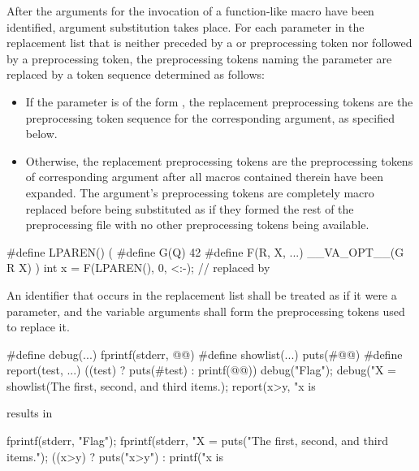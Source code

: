 \pnum
After the arguments for the invocation of a function-like macro have
been identified, argument substitution takes place.
For each parameter in the replacement list that is neither
preceded by a \tcode{\#} or \tcode{\#\#} preprocessing token nor
followed by a \tcode{\#\#} preprocessing token, the preprocessing tokens
naming the parameter are replaced by a token sequence determined as follows:
\begin{itemize}
\item
  If the parameter is of the form ,
  the replacement preprocessing tokens are the
  preprocessing token sequence for the corresponding argument,
  as specified below.
\item
  Otherwise, the replacement preprocessing tokens are the
  preprocessing tokens of corresponding argument after all
  macros contained therein have been expanded. The argument's
  preprocessing tokens are completely macro replaced before
  being substituted as if they formed the rest of the preprocessing
  file with no other preprocessing tokens being available.
\end{itemize}
\begin{example}
\begin{codeblock}
#define LPAREN() (
#define G(Q) 42
#define F(R, X, ...)  __VA_OPT__(G R X) )
int x = F(LPAREN(), 0, <:-);    // replaced by 
\end{codeblock}
\end{example}

\pnum
{}%
An identifier  that occurs in the replacement list
shall be treated as if it were a parameter, and the variable arguments shall form
the preprocessing tokens used to replace it.

\pnum
\begin{example}
\begin{codeblock}
#define debug(...) fprintf(stderr, @@)
#define showlist(...) puts(#@@)
#define report(test, ...) ((test) ? puts(#test) : printf(@@))
debug("Flag");
debug("X = %
showlist(The first, second, and third items.);
report(x>y, "x is %
\end{codeblock}
results in
\begin{codeblock}
fprintf(stderr, "Flag");
fprintf(stderr, "X = %
puts("The first, second, and third items.");
((x>y) ? puts("x>y") : printf("x is %
\end{codeblock}
\end{example}

